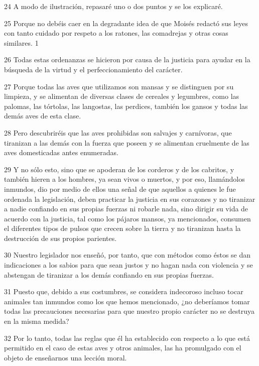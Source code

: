 \par 24 A modo de ilustración, repasaré uno o dos puntos y se los explicaré.

\par 25 Porque no debéis caer en la degradante idea de que Moisés redactó sus leyes con tanto cuidado por respeto a los ratones, las comadrejas y otras cosas similares. 1

\par 26 Todas estas ordenanzas se hicieron por causa de la justicia para ayudar en la búsqueda de la virtud y el perfeccionamiento del carácter.

\par 27 Porque todas las aves que utilizamos son mansas y se distinguen por su limpieza, y se alimentan de diversas clases de cereales y legumbres, como las palomas, las tórtolas, las langostas, las perdices, también los gansos y todas las demás aves de esta clase.

\par 28 Pero descubriréis que las aves prohibidas son salvajes y carnívoras, que tiranizan a las demás con la fuerza que poseen y se alimentan cruelmente de las aves domesticadas antes enumeradas.

\par 29 Y no sólo esto, sino que se apoderan de los corderos y de los cabritos, y también hieren a los hombres, ya sean vivos o muertos, y por eso, llamándolos inmundos, dio por medio de ellos una señal de que aquellos a quienes le fue ordenada la legislación, deben practicar la justicia en sus corazones y no tiranizar a nadie confiando en sus propias fuerzas ni robarle nada, sino dirigir su vida de acuerdo con la justicia, tal como los pájaros mansos, ya mencionados, consumen el diferentes tipos de pulsos que crecen sobre la tierra y no tiranizan hasta la destrucción de sus propios parientes.

\par 30 Nuestro legislador nos enseñó, por tanto, que con métodos como éstos se dan indicaciones a los sabios para que sean justos y no hagan nada con violencia y se abstengan de tiranizar a los demás confiando en sus propias fuerzas.

\par 31 Puesto que, debido a sus costumbres, se considera indecoroso incluso tocar animales tan inmundos como los que hemos mencionado, ¿no deberíamos tomar todas las precauciones necesarias para que nuestro propio carácter no se destruya en la misma medida?

\par 32 Por lo tanto, todas las reglas que él ha establecido con respecto a lo que está permitido en el caso de estas aves y otros animales, las ha promulgado con el objeto de enseñarnos una lección moral.

